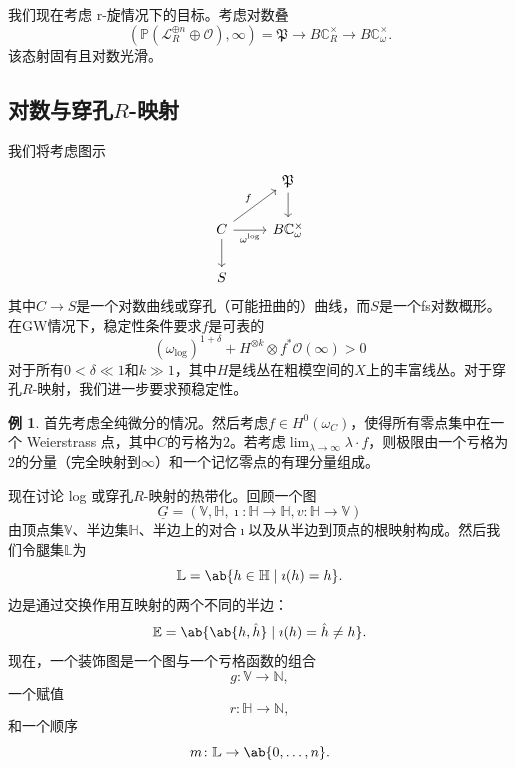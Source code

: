 \documentclass{amsart}
\theoremstyle{definition}
\newtheorem{exm}[thm]{例}
\theoremstyle{remark}
\theoremstyle{plain}
\theoremstyle{definition}
\theoremstyle{remark}
\newcommand{\N}{\mathbb{N}}
\newcommand{\C}{\mathbb{C}}
\newcommand{\E}{\mathbb{E}}
\newcommand{\V}{\mathbb{V}}
\renewcommand{\H}{\mathbb{H}}
\renewcommand{\L}{\mathbb{L}}
\renewcommand{\P}{\mathbb{P}}
\newcommand{\mc}[1]{\mathcal{#1}}
\newcommand{\mf}[1]{\mathfrak{#1}}
\newcommand{\ul}[1]{\underline{#1}}
\newcommand{\1}{\mathbf{1}}
\newcommand{\2}{\mathbf{2}}
\newcommand{\3}{\mathbf{3}}
\begin{document}
我们现在考虑 r-旋情况下的目标。考虑对数叠
\[ (\P(\mc{L}_R^{\oplus n} \oplus \mc{O}), \infty) = \mf{P} \to B \C_R^{\times} \to B \C_{\omega}^{\times}. \]
该态射固有且对数光滑。

\subsection{对数与穿孔\(R\)-映射}%
\label{sub:Log and punctured R-maps}

我们将考虑图示
\begin{equation*}
\begin{tikzcd}
    & \mf{P} \ar{d} \\
    C \ar{ur}{f} \ar{r}[swap]{\omega^{\log}} \ar{d} & B \C_{\omega}^{\times} \\
    S
\end{tikzcd}
\end{equation*}
其中\(C \to S\)是一个对数曲线或穿孔（可能扭曲的）曲线，而\(S\)是一个fs对数概形。在GW情况下，稳定性条件要求\(f\)是可表的
\[ (\omega_{\log})^{1+\delta} + H^{\otimes k} \otimes f^* \mc{O}(\infty) > 0 \]
对于所有\(0 < \delta \ll 1\)和\(k \gg 1\)，其中\(H\)是线丛在粗模空间的\(X\)上的丰富线丛。对于穿孔\(R\)-映射，我们进一步要求预稳定性。

\begin{exm}
    首先考虑全纯微分的情况。然后考虑\(f \in H^0(\omega_C)\)，使得所有零点集中在一个 Weierstrass 点，其中\(C\)的亏格为\(2\)。若考虑\(\lim_{\lambda \to \infty} \lambda \cdot f\)，则极限由一个亏格为\(2\)的分量（完全映射到\(\infty\)）和一个记忆零点的有理分量组成。
\end{exm}

现在讨论 log 或穿孔\(R\)-映射的热带化。回顾一个图
\[ \ul{G} = (\V, \H, \imath \colon \H \to \H, v \colon \H \to \V) \]
由顶点集\(\V\)、半边集\(\H\)、半边上的对合\(\imath\)以及从半边到顶点的根映射构成。然后我们令腿集\(\L\)为
\[ \L = \ab\{ h \in \H \mid \imath(h) = h\}. \]
边是通过交换作用互映射的两个不同的半边：
\[ \E = \ab\{ \ab\{h, \hat{h}\} \mid \imath(h) = \hat{h} \neq h \}. \]
现在，一个装饰图是一个图与一个亏格函数的组合
\[ g \colon \V \to \N, \]
一个赋值
\[ r \colon \H \to \N, \]
和一个顺序
\[ m \colon \L \to \ab\{0, \ldots, n\}. \]
\end{document}

